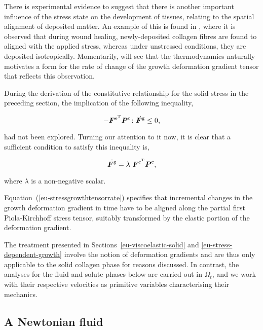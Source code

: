 There is experimental evidence to suggest that there is another
important influence of the stress state on the development of tissues,
relating to the spatial alignment of deposited matter.  An example of
this is found in \citet{Provenzanoetal:2003}, where it is observed
that during wound healing, newly-de\-po\-sit\-ed collagen fibres are
found to aligned with the applied stress, whereas under unstressed
conditions, they are deposited isotropically. Momentarily, will see
that the thermodynamics naturally motivates a form for the rate of
change of the growth deformation gradient tensor that reflects this
observation.

During the derivation of the constitutive relationship for the solid
stress in the preceding section, the implication of the following
inequality,

\begin{equation*}
- \mbox{\boldmath$ F$}^{\mathrm{e}^{\mathrm{T}}}  \mbox{\boldmath$ P$}^{\mathrm{c}} \colon
\dot{\mbox{\boldmath$ F$}^{\mathrm{g}}}
\leq 0,
\end{equation*}

\noindent had not been explored. Turning our attention to it now, it
is clear that a sufficient condition to satisfy this inequality is,

\begin{equation}
\dot{\bF^{\mathrm{g}}} = \lambda\ \bF^{\mathrm{e}^{\mathrm{T}}}
\bP^{\mathrm{c}},
\label{eu-stressgrowthtensorrate}
\end{equation}

\noindent where $\lambda$ is a non-negative scalar. 

Equation~(\ref{eu-stressgrowthtensorrate}) specifies that incremental
changes in the growth deformation gradient in time have to be aligned
along the partial first Piola-Kirchhoff stress tensor, suitably
transformed by the elastic portion of the deformation gradient.

The treatment presented in Sections~\ref{eu-viscoelastic-solid} and
\ref{eu-stress-dependent-growth} involve the notion of deformation
gradients and are thus only applicable to the solid collagen phase for
reasons discussed. In contrast, the analyses for the fluid and solute
phases below are carried out in $\Omega_{t}$, and we work with their
respective velocities as primitive variables characterising their
mechanics.
 
\subsection{A Newtonian fluid}
\label{eu-newtonian-fluid}

